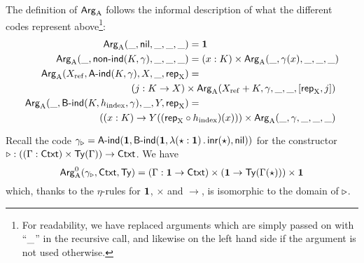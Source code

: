\documentclass{schwicht}
\begin{document}
The definition of $\mathsf{Arg}_{\mathrm{A}}$ follows the informal description of what the
different codes represent above\footnote{For readability, we have
  replaced arguments which are simply passed on with ``$\_$'' in
  the recursive call, and likewise on the left hand side if the
  argument is not used otherwise.}:
%
\begin{align*}%
  \ArgA(\omitt, \nilA, \omitt, \omitt, \omitt) &= \one \\
  \ArgA(\omitt, \nonindA(K, \gamma), \omitt, \omitt, \omitt) &= (x : K) \times \ArgA(\omitt, \gamma(x), \omitt, \omitt, \omitt) \\
  \ArgA(\Xref, \AindA(K, \gamma), \A, \omitt, \repA) &=  \\
\multispan{2}{\hfill $(j : K \to \A) \times \ArgA(\Xref + K, \gamma, \omitt, \omitt, [\repA, j])$} \\
  \ArgA(\omitt, \BindA(K, \hindex, \gamma), \omitt, \B, \repA) &= \\
\multispan{2}{\hfill $((x : K) \to \B((\repA \circ \hindex)(x))) \times \ArgA(\omitt, \gamma, \omitt, \omitt, \omitt)$}
\end{align*}


\begin{example}
  Recall the code $\gamma_{\triangleright} = \mathsf{A}\text{-}\mathsf{ind}(\mathbf{1}, \mathsf{B}\text{-}\mathsf{ind}(\mathbf{1},
  \lambda (\star : \mathbf{1})\,.\,\mathsf{inr}(\star), \mathsf{nil}))$ for the
  constructor $\triangleright : ((\Gamma : \mathsf{Ctxt}) \times \mathsf{Ty}(\Gamma)) \to
  \mathsf{Ctxt}$. We have 
\[
\mathsf{Arg}^{0}_{\mathrm{A}}(\gamma_{\triangleright}, \mathsf{Ctxt}, \mathsf{Ty}) = (\Gamma : \mathbf{1} \to \mathsf{Ctxt})
\times (\mathbf{1} \to \mathsf{Ty}(\Gamma(\star))) \times \mathbf{1}
\]
which, thanks to the $\eta$-rules for $\mathbf{1}$, $\times$ and $\to$, is isomorphic to the
domain of $\triangleright$. 
\blackqed
\end{example}
\end{document}

